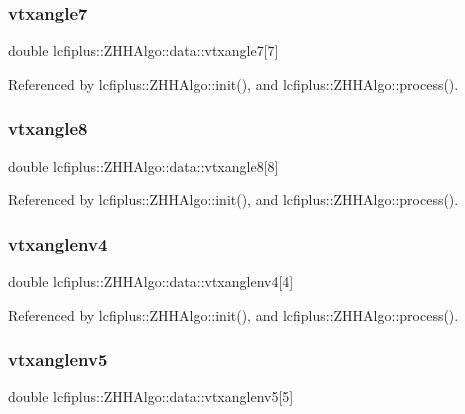 \subsubsection{vtxangle7}
{\footnotesize\ttfamily double lcfiplus\+::\+Z\+H\+H\+Algo\+::data\+::vtxangle7[7]}



Referenced by lcfiplus\+::\+Z\+H\+H\+Algo\+::init(), and lcfiplus\+::\+Z\+H\+H\+Algo\+::process().

\mbox{\label{structlcfiplus_1_1ZHHAlgo_1_1data_a646e52e33667ae1c68f6ec0d40607514}} 
\subsubsection{vtxangle8}
{\footnotesize\ttfamily double lcfiplus\+::\+Z\+H\+H\+Algo\+::data\+::vtxangle8[8]}



Referenced by lcfiplus\+::\+Z\+H\+H\+Algo\+::init(), and lcfiplus\+::\+Z\+H\+H\+Algo\+::process().

\mbox{\label{structlcfiplus_1_1ZHHAlgo_1_1data_ab90b6bcf1de3fdeede89ae76678b9bf3}} 
\subsubsection{vtxanglenv4}
{\footnotesize\ttfamily double lcfiplus\+::\+Z\+H\+H\+Algo\+::data\+::vtxanglenv4[4]}



Referenced by lcfiplus\+::\+Z\+H\+H\+Algo\+::init(), and lcfiplus\+::\+Z\+H\+H\+Algo\+::process().

\mbox{\label{structlcfiplus_1_1ZHHAlgo_1_1data_a793ec0d906bdbdcc75ec7b84d5cb26b9}} 
\subsubsection{vtxanglenv5}
{\footnotesize\ttfamily double lcfiplus\+::\+Z\+H\+H\+Algo\+::data\+::vtxanglenv5[5]}



